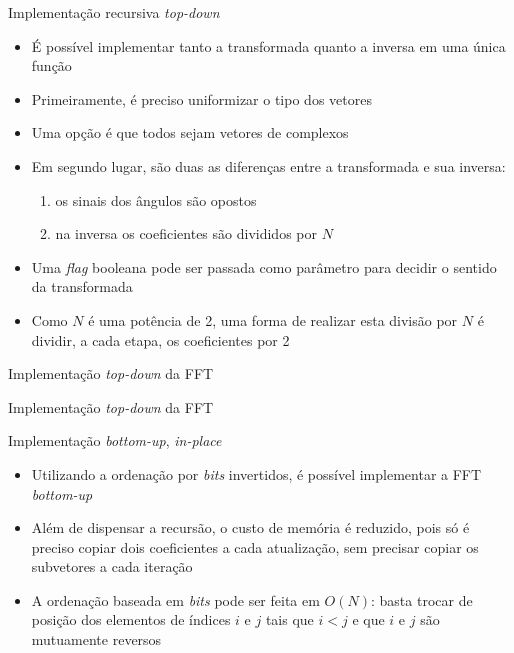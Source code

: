 \begin{frame}[fragile]{Implementação recursiva {\it top-down}}

    \begin{itemize}
        \item É possível implementar tanto a transformada quanto a inversa em uma única função

        \item Primeiramente, é preciso uniformizar o tipo dos vetores

        \item Uma opção é que todos sejam vetores de complexos

        \item Em segundo lugar, são duas as diferenças entre a transformada e sua inversa:
        \begin{enumerate}
            \item os sinais dos ângulos são opostos
            \item na inversa os coeficientes são divididos por $N$
        \end{enumerate}

        \item Uma \textit{flag} booleana pode ser passada como parâmetro para decidir o sentido
            da transformada

        \item Como $N$ é uma potência de 2, uma forma de realizar esta divisão por $N$ é dividir,
            a cada etapa, os coeficientes por 2
    \end{itemize}

\end{frame}

\begin{frame}[fragile]{Implementação {\it top-down} da FFT}
\end{frame}

\begin{frame}[fragile]{Implementação {\it top-down} da FFT}
\end{frame}

\begin{frame}[fragile]{Implementação {\it bottom-up}, {\it in-place}}

    \begin{itemize}
        \item Utilizando a ordenação por \textit{bits} invertidos, é possível implementar a FFT
            \textit{bottom-up}

        \item Além de dispensar a recursão, o custo de memória é reduzido, pois só é preciso
            copiar dois coeficientes a cada atualização, sem precisar copiar os subvetores a cada
            iteração

        \item A ordenação baseada em \textit{bits} pode ser feita em $O(N)$: basta trocar de 
            posição dos elementos de índices $i$ e $j$ tais que $i < j$ e que $i$ e $j$ são
            mutuamente reversos 
    \end{itemize}

\end{frame}

